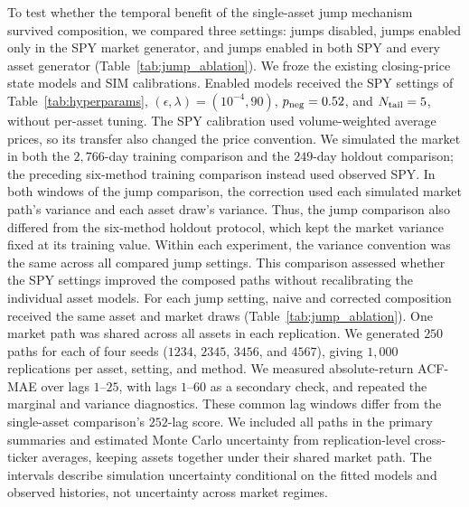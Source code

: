 To test whether the temporal benefit of the single-asset jump mechanism
survived composition, we compared three settings: jumps disabled,
jumps enabled only in the SPY market generator, and jumps enabled in
both SPY and every asset generator
(Table~\ref{tab:jump_ablation}). We froze the existing closing-price
state models and SIM calibrations. Enabled models received the SPY
settings of Table~\ref{tab:hyperparams}, $(\epsilon,\lambda)=(10^{-4},90)$, $p_{\rm neg}=0.52$, and
$N_{\rm tail}=5$, without per-asset tuning. The SPY calibration used volume-weighted average prices, so its
transfer also changed the price convention. We simulated the market in both the
$2{,}766$-day training comparison and the $249$-day holdout comparison;
the preceding six-method training comparison instead used observed
SPY. In both windows of the jump comparison, the correction used each
simulated market path's variance and each asset draw's variance. Thus,
the jump comparison also differed from the six-method holdout protocol,
which kept the market variance fixed at its training value. Within
each experiment, the variance convention was the same across all
compared jump settings. This comparison assessed whether the SPY settings improved the
composed paths without recalibrating the individual asset models.
For each jump setting, naive and corrected composition received the
same asset and market draws (Table~\ref{tab:jump_ablation}). One market path was shared across all
assets in each replication. We generated $250$ paths for each of four
seeds ($1234$, $2345$, $3456$, and $4567$), giving $1{,}000$
replications per asset, setting, and method. We measured absolute-return
ACF-MAE over lags $1$--$25$, with lags $1$--$60$ as a secondary check,
and repeated the marginal and variance diagnostics. These common lag
windows differ from the single-asset comparison's $252$-lag score.
We included all paths in the primary summaries and estimated Monte
Carlo uncertainty from replication-level cross-ticker averages, keeping
assets together under their shared market path. The intervals describe
simulation uncertainty conditional on the fitted models and observed
histories, not uncertainty across market regimes.
